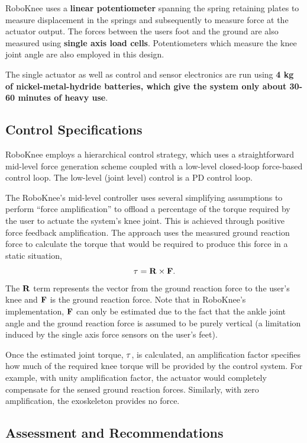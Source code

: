 \begin{refsection}
 RoboKnee uses a \textbf{linear potentiometer} spanning the spring retaining plates to measure displacement in the springs and subsequently to measure force at the actuator output.  The forces between the users foot and the ground are also measured using \textbf{single axis load cells}.  Potentiometers which measure the knee joint angle are also employed in this design.     
 
 The single actuator as well as control and sensor electronics are run using {\bf 4 kg of nickel-metal-hydride batteries, which give the system only about 30-60 minutes of heavy use}.
 
 
 \subsection{Control Specifications}
 
 RoboKnee employs a hierarchical control strategy, which uses a straightforward mid-level force generation scheme coupled with a low-level closed-loop force-based control loop.  The low-level (joint level) control is a PD control loop.
 
 The RoboKnee's mid-level controller uses several simplifying assumptions to perform ``force amplification'' to offload a percentage of the torque required by the user to actuate the system's knee joint.  This is achieved through positive force feedback amplification.  The approach uses the measured ground reaction force to calculate the torque that would be required to produce this force in a static situation, \[ {\bf \tau} = {\bf R} \times {\bf F}.\]  The ${\bf R}$ term represents the vector from the ground reaction force to the user's knee and ${\bf F}$ is the ground reaction force.  Note that in RoboKnee's implementation, ${\bf F}$ can only be estimated due to the fact that the ankle joint angle and the ground reaction force is assumed to be purely vertical (a limitation induced by the single axis force sensors on the user's feet).
   
   
 Once the estimated joint torque, ${\bf \tau}$, is calculated, an amplification factor specifies how much of the required knee torque will be provided by the control system.  For example, with unity amplification factor, the actuator would completely compensate for the sensed ground reaction forces.  Similarly, with zero amplification, the exoskeleton provides no force.
  
 
 \subsection{Assessment and Recommendations} 
 

\end{refsection}
